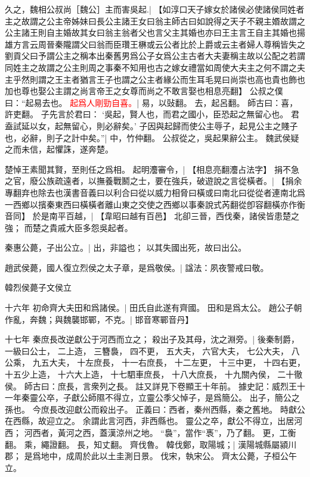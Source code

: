 久之，魏相公叔尚［魏公］主而害吳起.|{
	【如淳口天子嫁女於諸侯必使諸侯同姓者主之故謂之公主帝姊妹曰長公主諸王女曰翁主師古曰如說得之天子不親主㛰故謂之公主諸王則自主婚故其女曰翁主翁者父也言父主其婚也亦曰王主言王自主其婚也揚雄方言云周晉秦隴謂父曰翁而臣瓚王楙或云公者比於上爵或云主者婦人尊稱皆失之劉貢父曰予謂公主之稱本出秦舊男爲公子女爲公主古者大夫妻稱主故以公配之若謂同姓主之故謂之公主則周之事秦不知用也古之嫁女禮當如周使大夫主之何不謂之夫主乎然則謂之王主者猶言王子也謂之公主者緣公而生耳毛晃曰尚崇也高也貴也飾也加也尊也娶公主謂之尚言帝王之女尊而尚之不敢言娶也相息亮翻】
	}
公叔之僕曰：“起易去也。
\textcolor{red}{起爲人剛勁自喜。}|{
	易，以䜴翻。
	去，起呂翻。
	師古曰：喜，許吏翻。
	}
子先言於君曰：
‘吳起，賢人也，而君之國小，臣恐起之無留心也。
君盍試延以女，起無留心，則必辭矣。’
子因與起歸而使公主辱子，起見公主之賤子也，必辭，則子之計中矣。”|{
	中，竹仲翻。}
公叔從之，吳起果辭公主。
魏武侯疑之而未信，起懼誅，遂奔楚。

楚悼王素聞其賢，至則任之爲相。%
起明灋審令，|{
	【相息亮翻灋占法字】}
捐不急之官，廢公族疏遠者，以撫養戰鬭之士，要在強兵，破遊說之言從橫者。|{
	【捐余專翻弃也除去也漢書音義曰以利合曰從以威力相脅曰橫或曰南北曰從從者連南北爲一西鄉以擯秦東西曰橫橫者離山東之交使之西鄉以事秦說式芮翻從卽容翻橫亦作衡音同】}
於是南平百越，|{
	【韋昭曰越有百邑】}
北卻三晉，西伐秦，諸侯皆患楚之強；
而楚之貴戚大臣多怨吳起者。

秦惠公薨，子出公立。|{
	出，非謚也；
	以其失國出死，故曰出公。
	}

趙武侯薨，國人復立烈侯之太子章，是爲敬侯。|{
	諡法：夙夜警戒曰敬。
	}

韓烈侯薨子文侯立


十六年
初命齊大夫田和爲諸侯。|{
	田氏自此遂有齊國。
	田和是爲太公。
	}
趙公子朝作亂，奔魏；與魏襲邯鄲，不克。|{
	邯音寒鄲音丹】}
\par
十七年
秦庶長改逆獻公于河西而立之；
殺出子及其母，沈之淵旁。|{
	後秦制爵，
	一級曰公士，
	二上造，
	三簪裊，
	四不更，
	五大夫，
	六官大夫，
	七公大夫，
	八公乘，
	九五大夫，
	十左庶長，
	十一右庶長，
	十二左更，
	十三中更，
	十四右更，
	十五少上造，
	十六大上造，
	十七駟車庶長，
	十八大庶長，
	十九關內侯，
	二十徹侯。
	師古曰：庶長，言衆列之長。
	註又詳見下卷顯王十年前。
	據史記：威烈王十一年秦靈公卒，子獻公師隰不得立，立靈公季父悼子，是爲簡公。
	出子，簡公之孫也。
	今庶長改迎獻公而殺出子。
	正義曰：西者，秦州西縣，秦之舊地。
	時獻公在西縣，故迎立之。
	余謂此言河西，非西縣也。
	靈公之卒，獻公不得立，出居河西；
	河西者，黃河之西，蓋漢涼州之地。
	“裊”，當作“褭”，乃了翻。
	更，工衡翻。
	乘，繩證翻。
	長，知丈翻。
	}
齊伐魯。
韓伐鄭，取陽城；|{
	漢陽城縣屬潁川郡；
	是爲地中，成周於此以土圭測日景。
	}
伐宋，執宋公。
齊太公薨，子桓公午立。


